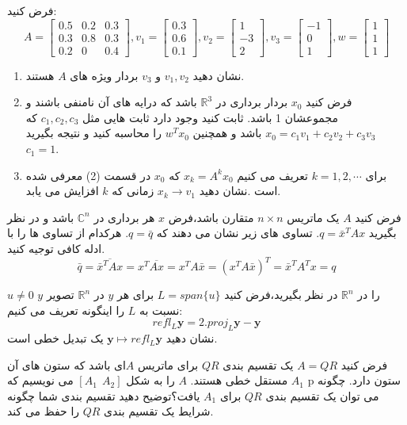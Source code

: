 \documentclass{article}
\begin{document}
  فرض کنید:
 $$A=\begin{bmatrix}
 0.5&0.2&0.3\\
 0.3&0.8&0.3\\
 0.2&0&0.4
 \end{bmatrix}
 ,v_1=
 \begin{bmatrix}
 0.3\\
 0.6\\
 0.1
 \end{bmatrix}
 ,v_2=
 \begin{bmatrix}
 1\\
 -3\\
 2
 \end{bmatrix}
 ,
 v_3=
 \begin{bmatrix}
 -1\\
 0\\
 1
 \end{bmatrix}
 ,
 w=
 \begin{bmatrix}
 1\\
 1\\
 1
 \end{bmatrix}
 $$
 \begin{enumerate}
 	\item 
 	نشان دهید 
 	$v_1,v_2$
 	و 
 	$v_3$
 	بردار ویژه های 
 	$A$
 	هستند.
 	\item
 	فرض کنید 
 	$x_0$
 	بردار برداری در 
 	$\mathbb{R}^3$
 	باشد که درایه های آن نامنفی باشند و مجموعشان 1 باشد. ثابت کنید وجود دارد ثابت هایی مثل 
 	$c_1,c_2,c_3$
 	که 
 	$x_0=c_1v_1+c_2v_2+c_3v_3$
 	باشد و همچنین 
 	$w^{T}x_0$
 	را محاسبه کنید و نتیجه بگیرید 
 	$c_1=1$.
 	
 	\item 
 	برای 
 	$k=1,2,\cdots$
 	تعریف می کنیم 
 	$x_k=A^kx_0$
 	که 
 	$x_0$
 	در قسمت (2) معرفی شده است .نشان دهید 
 	$x_k\to v_1$
 	زمانی که 
 	$k$
 	افزایش می یابد.
 \end{enumerate}


فرض کنید 
$A$
یک ماتریس 
$n\times n$
متقارن باشد،فرض 
$x$
هر برداری در 
$\mathbb{C}^n$
باشد و در نظر بگیرید 
$q=\bar{x}^TAx$.
تساوی های زیر نشان می دهند که 
$q=\bar{q}$.
هرکدام از تساوی ها را با ادله کافی توجیه کنید.
$$\bar{q}=\overline{\bar{x}^TAx}=x^T\overline{Ax}=x^TA\bar{x}=(x^TA\bar{x})^T=\bar{x}^TA^Tx=q$$



$u\neq 0$
را در 
$\mathbb{R}^n$
در نظر بگیرید،فرض کنید 
$L=span\{u\}$
برای هر 
$y$
در 
$\mathbb{R}^n$
تصویر 
$y$
نسبت به 
$L$
را اینگونه تعریف می کنیم:
$$refl_L \boldsymbol{y}=2.proj_L\boldsymbol{y}-\boldsymbol{y}$$
نشان دهید 
$\boldsymbol{y}\mapsto refl_L\boldsymbol{y}$
یک تبدیل خطی است.


 فرض کنید 
$A=QR$
یک تقسیم بندی 
$QR$
برای ماتریس 
$A$ای
باشد که ستون های آن مستقل خطی هستند.
$A$
را به شکل 
$[A_1 \ \ A_2]$
می نویسیم که 
$A_1$
p ستون دارد.
چگونه می توان یک تقسیم بندی 
$QR$
برای 
$A_1$
یافت؟توضیح دهید تقسیم بندی شما چگونه شرایط یک تقسیم بندی 
$QR$
را حفظ می کند.
\end{document}
